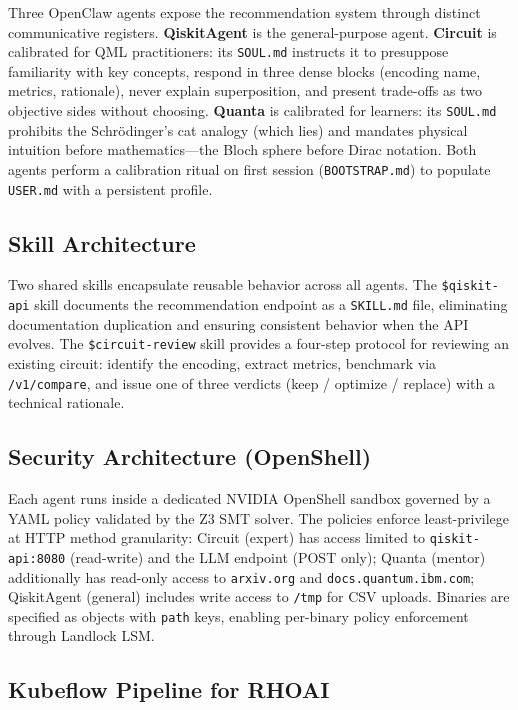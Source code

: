\documentclass[sigconf,nonacm]{acmart}
\begin{document}
Three OpenClaw agents expose the recommendation system through distinct communicative
registers. \textbf{QiskitAgent} is the general-purpose agent. \textbf{Circuit}
is calibrated for QML practitioners: its \texttt{SOUL.md} instructs it to
presuppose familiarity with key concepts, respond in three dense blocks (encoding
name, metrics, rationale), never explain superposition, and present trade-offs as
two objective sides without choosing. \textbf{Quanta} is calibrated for learners:
its \texttt{SOUL.md} prohibits the Schr\"odinger's cat analogy (which lies) and
mandates physical intuition before mathematics---the Bloch sphere before Dirac
notation. Both agents perform a calibration ritual on first session
(\texttt{BOOTSTRAP.md}) to populate \texttt{USER.md} with a persistent profile.

\subsection{Skill Architecture}

Two shared skills encapsulate reusable behavior across all agents.
The \texttt{\$qiskit-api} skill documents the recommendation endpoint as a
\texttt{SKILL.md} file, eliminating documentation duplication and ensuring
consistent behavior when the API evolves. The \texttt{\$circuit-review} skill
provides a four-step protocol for reviewing an existing circuit: identify
the encoding, extract metrics, benchmark via \texttt{/v1/compare}, and issue
one of three verdicts (keep / optimize / replace) with a technical rationale.

\subsection{Security Architecture (OpenShell)}

Each agent runs inside a dedicated NVIDIA OpenShell sandbox governed by a YAML
policy validated by the Z3 SMT solver. The policies enforce least-privilege at HTTP
method granularity: Circuit (expert) has access limited to
\texttt{qiskit-api:8080} (read-write) and the LLM endpoint (POST only); Quanta
(mentor) additionally has read-only access to \texttt{arxiv.org} and
\texttt{docs.quantum.ibm.com}; QiskitAgent (general) includes write access to
\texttt{/tmp} for CSV uploads. Binaries are specified as objects with \texttt{path}
keys, enabling per-binary policy enforcement through Landlock LSM.

\subsection{Kubeflow Pipeline for RHOAI}
\end{document}
